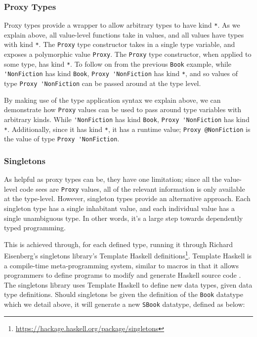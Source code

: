 \documentclass[12pt, a4paper, bibliography=totocnumbered]{scrreprt}
\newcommand{\inline}[1]{\lstinline[basicstyle=\ttfamily\footnotesize]{#1}}
\begin{document}
\subsubsection{Proxy Types}

Proxy types provide a wrapper to allow arbitrary types to have kind \inline{*}. As we explain above, all value-level functions take in values, and all values have types with kind \inline{*}. The \inline{Proxy} type constructor takes in a single type variable, and exposes a polymorphic value \inline{Proxy}. The \inline{Proxy} type constructor, when applied to some type, has kind \inline{*}. To follow on from the previous \inline{Book} example, while \inline{'NonFiction} has kind \inline{Book}, \inline{Proxy 'NonFiction} has kind \inline{*}, and so values of type \inline{Proxy 'NonFiction} can be passed around at the type level.

By making use of the type application syntax we explain above, we can demonstrate how \inline{Proxy} values can be used to pass around type variables with arbitrary kinds. While \inline{'NonFiction} has kind \inline{Book}, \inline{Proxy 'NonFiction} has kind \inline{*}. Additionally, since it has kind \inline{*}, it has a runtime value; \inline{Proxy @NonFiction} is the value of type \inline{Proxy 'NonFiction}.

\subsubsection{Singletons}

As helpful as proxy types can be, they have one limitation; since all the value-level code sees are \inline{Proxy} values, all of the relevant information is only available at the type-level. However, singleton types \cite{singletons} provide an alternative approach. Each singleton type has a single inhabitant value, and each individual value has a single unambiguous type. In other words, it's a large step towards dependently typed programming.

This is achieved through, for each defined type, running it through Richard Eisenberg's singletons library's Template Haskell definitions\footnote{\url{https://hackage.haskell.org/package/singletons}}. Template Haskell is a compile-time meta-programming system, similar to macros in that it allows programmers to define programs to modify and generate Haskell source code \cite{templatehaskell}. The singletons library uses Template Haskell to define new data types, given data type definitions. Should singletons be given the definition of the \inline{Book} datatype which we detail above, it will generate a new \inline{SBook} datatype, defined as below:
\end{document}
